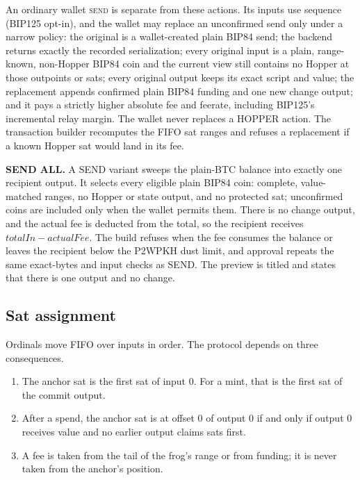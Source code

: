 An ordinary wallet \textsc{send} is separate from these actions. Its inputs
use sequence  (BIP125 opt-in), and the wallet may replace an
unconfirmed send only under a narrow policy: the original is a wallet-created
plain BIP84 send; the backend returns exactly the recorded serialization;
every original input is a plain, range-known, non-Hopper BIP84 coin and the
current view still contains no Hopper at those outpoints or sats; every
original output keeps its exact script and value; the replacement appends
confirmed plain BIP84 funding and one new change output; and it pays a
strictly higher absolute fee and feerate, including BIP125's incremental
relay margin. The wallet never replaces a HOPPER action. The transaction
builder recomputes the FIFO sat ranges and refuses a replacement if a known
Hopper sat would land in its fee.

\textbf{SEND ALL.} A SEND variant sweeps the plain-BTC balance into exactly
one recipient output. It selects every eligible plain BIP84 coin: complete,
value-matched ranges, no Hopper or state output, and no protected sat;
unconfirmed coins are included only when the wallet permits them. There is no
change output, and the actual fee is deducted from the total, so the recipient
receives $\mathit{totalIn}-\mathit{actualFee}$. The build refuses when the
fee consumes the balance or leaves the recipient below the P2WPKH dust limit,
and approval repeats the same exact-bytes and input checks as SEND. The
preview is titled  and states that there is one output
and no change.

\subsection{Sat assignment}

Ordinals move FIFO over inputs in order. The protocol depends on three
consequences.

\begin{enumerate}[leftmargin=1.6em,itemsep=0.22em]
  \item The anchor sat is the first sat of input 0. For a mint, that is the
        first sat of the commit output.
  \item After a spend, the anchor sat is at offset 0 of output 0 if and only
        if output 0 receives value and no earlier output claims sats first.
  \item A fee is taken from the tail of the frog's range or from funding; it
        is never taken from the anchor's position.
\end{enumerate}

